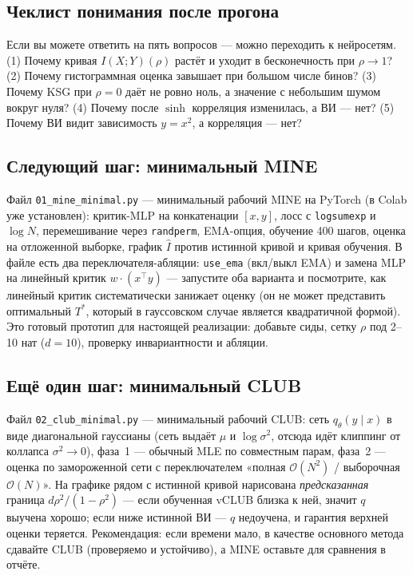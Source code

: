 \documentclass[11pt]{article}
\newcommand{\MI}{I(X;Y)}
\begin{document}
\subsection{Чеклист понимания после прогона}

Если вы можете ответить на пять вопросов — можно переходить к нейросетям. (1) Почему кривая $\MI(\rho)$ растёт и уходит в бесконечность при $\rho\to1$? (2) Почему гистограммная оценка завышает при большом числе бинов? (3) Почему KSG при $\rho=0$ даёт не ровно ноль, а значение с небольшим шумом вокруг нуля? (4) Почему после $\sinh$ корреляция изменилась, а ВИ — нет? (5) Почему ВИ видит зависимость $y=x^2$, а корреляция — нет?

\subsection{Следующий шаг: минимальный MINE}

Файл \texttt{01\_mine\_minimal.py} — минимальный рабочий MINE на PyTorch (в Colab уже установлен): критик-MLP на конкатенации $[x,y]$, лосс с \texttt{logsumexp} и $\log N$, перемешивание через \texttt{randperm}, EMA-опция, обучение 400 шагов, оценка на отложенной выборке, график $\hat I$ против истинной кривой и кривая обучения. В файле есть два переключателя-абляции: \texttt{use\_ema} (вкл/выкл EMA) и замена MLP на линейный критик $w\cdot(x^\top y)$ — запустите оба варианта и посмотрите, как линейный критик систематически занижает оценку (он не может представить оптимальный $T^*$, который в гауссовском случае является квадратичной формой). Это готовый прототип для настоящей реализации: добавьте сиды, сетку $\rho$ под 2--10 нат ($d=10$), проверку инвариантности и абляции.

\subsection{Ещё один шаг: минимальный CLUB}

Файл \texttt{02\_club\_minimal.py} — минимальный рабочий CLUB: сеть $q_\theta(y\mid x)$ в виде диагональной гауссианы (сеть выдаёт $\mu$ и $\log\sigma^2$, отсюда идёт клиппинг от коллапса $\sigma^2\to0$), фаза~1 — обычный MLE по совместным парам, фаза~2 — оценка по замороженной сети с переключателем «полная $\mathcal{O}(N^2)$ / выборочная $\mathcal{O}(N)$». На графике рядом с истинной кривой нарисована \emph{предсказанная} граница $d\rho^2/(1-\rho^2)$ — если обученная vCLUB близка к ней, значит $q$ выучена хорошо; если ниже истинной ВИ — $q$ недоучена, и гарантия верхней оценки теряется. Рекомендация: если времени мало, в качестве основного метода сдавайте CLUB (проверяемо и устойчиво), а MINE оставьте для сравнения в отчёте.
\end{document}

